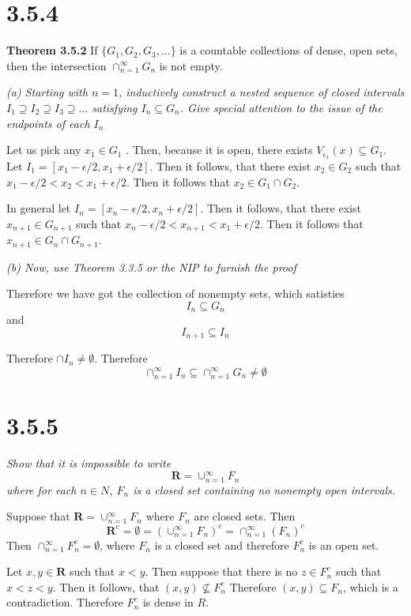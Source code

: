 \documentclass[11pt,oneside,titlepage]{article}
\begin{document}
\section*{3.5.4}
\textbf{Theorem 3.5.2}  If $\{G_1, G_2, G_3, ... \}$ is a countable collections of dense,
open sets, then the intersection $\cap_{n = 1}^{\infty} G_n $ is not empty.

\textit{(a) Starting with $n = 1$, inductively construct a nested sequence of
  closed intervals $I_1 \supseteq I_2 \supseteq I_3 \supseteq ... $
  satisfying $I_n \subseteq G_n$. Give special attention to the issue of the
  endpoints of each $I_n$}

Let us pick any $x_1 \in G_1$ . Then, because it is open, there exists
$V_{\epsilon_1}(x) \subseteq G_1$. Let
$I_1 = [x_1 - \epsilon / 2, x_1 + \epsilon / 2]$. Then it follows, that there
exist $x_2 \in G_2$ such that $x_1 - \epsilon / 2 < x_2 < x_1 + \epsilon / 2$.
Then it follows that $x_2 \in  G_1 \cap G_2$.

In general  let
$I_n = [x_n - \epsilon / 2, x_n + \epsilon / 2]$. Then it follows, that there
exist $x_{n + 1} \in G_{n + 1}$ such that
$x_n - \epsilon / 2 < x_{n + 1} < x_1 + \epsilon / 2$.
Then it follows that $x_{n + 1} \in  G_{n} \cap G_{n + 1}$.

\textit{(b) Now, use Theorem 3.3.5 or the NIP to furnish the proof}

Therefore we have got the collection of nonempty sets, which satisties
$$I_n \subseteq G_n$$
and
$$I_{n + 1} \subseteq I_n$$

Therefore $\cap I_n \neq \emptyset$. Therefore
$$\cap_{n = 1}^{\infty} I_n \subseteq
\cap_{n = 1}^{\infty} G_n \neq \emptyset$$

\section*{3.5.5}
\textit{Show that it is impossible to write}
$$\textbf{R} = \cup_{n = 1}^{\infty}F_n$$
\textit{where for each $n \in N$, $F_n$ is a closed set containing
  no nonempty open intervals.}

Suppose that $\textbf{R} = \cup_{n = 1}^{\infty}F_n$ where $F_n$ are closed
sets. Then 
$$\textbf{R}^c = \emptyset = (\cup_{n = 1}^{\infty}F_n)^c =
\cap_{n = 1}^{\infty}(F_n)^c$$
Then $\cap_{n = 1}^{\infty}F_n^c = \emptyset $, where $F_n$ is a closed
set and therefore $F_n^c$ is an open set.

Let  $x,y \in \textbf{R} $ such that $x < y$. Then suppose that
there is no $z \in F_n^c$ such that $x < z < y$. Then it follows, that
$(x, y) \not \subseteq F_n^c$ Therefore $(x, y) \subseteq F_n$, which is a
contradiction. Therefore $F_n^c$ is dense in $R$.
\end{document}
